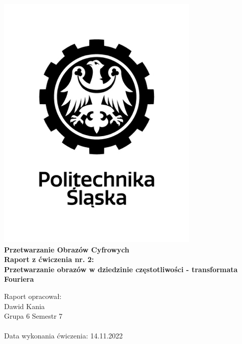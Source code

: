 
\begin{titlepage}
    \begin{center}
        \includegraphics[width=.50\linewidth]{other/polsl.png}\\
        \Huge
        \textbf{Przetwarzanie Obrazów Cyfrowych}
        \\ \vspace{1.5cm}
        \Large
        \textbf{Raport z ćwiczenia nr. 2: } \\
        \textbf{Przetwarzanie obrazów w dziedzinie częstotliwości - transformata Fouriera}        
    \end{center}
    \vspace{2.5cm}
    \Large
    Raport opracował: \\
    Dawid Kania \\
    Grupa 6 Semestr 7 \\ \\
    Data wykonania ćwiczenia: 14.11.2022
\end{titlepage}
